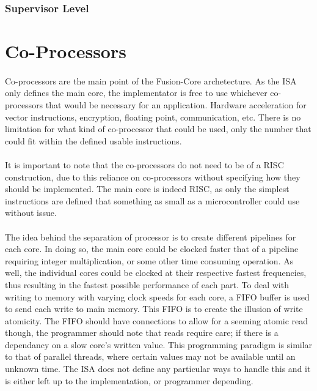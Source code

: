 \documentclass[letterpaper, 11pt]{article}
\begin{document}
\subsubsection{Supervisor Level}

\section{Co-Processors}
\paragraph{}Co-processors are the main point of the Fusion-Core archetecture. As the ISA only defines the main core, the implementator is free to use
whichever co-processors that would be necessary for an application. Hardware acceleration for vector instructions, encryption, floating point, communication,
etc. There is no limitation for what kind of co-processor that could be used, only the number that could fit within the defined usable instructions.
\paragraph{}It is important to note that the co-processors do not need to be of a RISC construction, due to this reliance on co-processors without
specifying how they should be implemented. The main core is indeed RISC, as only the simplest instructions are defined that something as small as a microcontroller
could use without issue.
\paragraph{}The idea behind the separation of processor is to create different pipelines for each core. In doing so, the main core could be clocked faster that of
a pipeline requiring integer multiplication, or some other time consuming operation. As well, the individual cores could be clocked at their respective 
fastest frequencies, thus resulting in the fastest possible performance of each part. To deal with writing to memory with varying clock speeds for each core,
a FIFO buffer is used to send each write to main memory. This FIFO is to create the illusion of write atomicity. The FIFO should have connections to allow
for a seeming atomic read though, the programmer should note that reads require care; if there is a dependancy on a slow core's written value. This programming 
paradigm is similar to that of parallel threads, where certain values may not be available until an unknown time. The ISA does not define any particular ways
to handle this and it is either left up to the implementation, or programmer depending.
\end{document}
